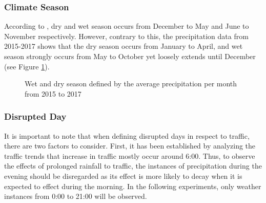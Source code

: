 \subsubsection{Climate Season}

According to , dry and wet season occurs from December to May and June to November respectively. However, contrary to this, the precipitation data from 2015-2017 shows that the dry season occurs from January to April, and wet season strongly occurs from May to October yet loosely extends until December (see Figure \ref{figure_ave_precip}).

\begin{figure}[h]
  \centering
  \captionsetup{justification=centering}
  \caption{Wet and dry season defined by the average precipitation per month from 2015 to 2017}
\label{figure_ave_precip}
\end{figure}



\subsubsection{Disrupted Day}

It is important to note that when defining disrupted days in respect to traffic, there are two factors to consider. First, it has been established by analyzing the traffic trends that increase in traffic mostly occur around 6:00. Thus, to observe the effects of prolonged rainfall to traffic, the instances of precipitation during the evening should be disregarded as its effect is more likely to decay when it is expected to effect during the morning. In the following experiments, only weather instances from 0:00 to 21:00 will be observed.

